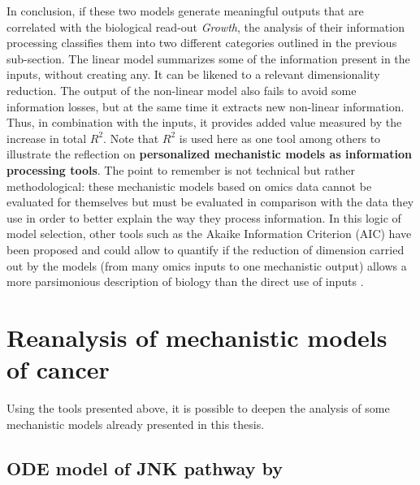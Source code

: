 \documentclass[a4paper,12pt,twoside,onecolumn,openright,final,oldfontcommands]{memoir}
\begin{document}
In conclusion, if these two models generate meaningful outputs that are
correlated with the biological read-out \emph{Growth}, the analysis of
their information processing classifies them into two different
categories outlined in the previous sub-section. The linear model
summarizes some of the information present in the inputs, without
creating any. It can be likened to a relevant dimensionality reduction.
The output of the non-linear model also fails to avoid some information
losses, but at the same time it extracts new non-linear information.
Thus, in combination with the inputs, it provides added value measured
by the increase in total \(R^2\). Note that \(R^2\) is used here as one
tool among others to illustrate the reflection on \textbf{personalized
mechanistic models as information processing tools}. The point to
remember is not technical but rather methodological: these mechanistic
models based on omics data cannot be evaluated for themselves but must
be evaluated in comparison with the data they use in order to better
explain the way they process information. In this logic of model
selection, other tools such as the Akaike Information Criterion (AIC)
have been proposed and could allow to quantify if the reduction of
dimension carried out by the models (from many omics inputs to one
mechanistic output) allows a more parsimonious description of biology
than the direct use of inputs \citep{kirk2013model}.

\section{Reanalysis of mechanistic models of
cancer}\label{reanalysis-of-mechanistic-models-of-cancer}

Using the tools presented above, it is possible to deepen the analysis
of some mechanistic models already presented in this thesis.

\subsection{\texorpdfstring{ODE model of JNK pathway by
\citet{fey2015signaling}}{ODE model of JNK pathway by @fey2015signaling}}\label{ode-model-of-jnk-pathway-by-fey2015signaling}
\end{document}

